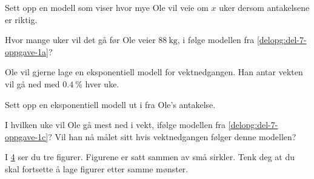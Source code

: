 \begin{oppgaver}
   Sett opp en modell som viser hvor mye Ole vil veie om $x$ uker
  dersom antakelsene er riktig.
  \label{delopg:del-7-oppgave-1a}
\end{oppgaver}

\begin{oppgaver}
   Hvor mange uker vil det gå før Ole veier $\SI{88}{\kg}$, i følge
  modellen fra \cref{delopg:del-7-oppgave-1a}?
\end{oppgaver}

Ole vil gjerne lage en eksponentiell modell for vektnedgangen. Han antar vekten
vil gå ned med $\SI{0.4}{\percent}$ hver uke.

\begin{oppgaver}
   Sett opp en eksponentiell modell ut i fra Ole's antakelse.
  \label{delopg:del-7-oppgave-1c}
\end{oppgaver}

\begin{oppgaver}
   I hvilken uke vil Ole gå mest ned i vekt, ifølge modellen fra
  \cref{delopg:del-7-oppgave-1c}?
  Vil han nå målet sitt hvis vektnedgangen følger denne modellen?
\end{oppgaver}


\Oppgave[4] %

\begin{figure}[H]
  \centering
  \begin{subfigure}[b]{0.32\textwidth}
    \centering
    \caption{}
    \label{fig:del-1-oppgave-8-a}
  \end{subfigure}\hfill%
  \begin{subfigure}[b]{0.32\textwidth}
    \centering
    \caption{}
    \label{fig:del-1-oppgave-8-b}
  \end{subfigure}\hfill%
  \begin{subfigure}[b]{0.32\textwidth}
    \centering
    \vspace{-0.45cm}
    \caption{}
    \label{fig:del-1-oppgave-8-c}
  \end{subfigure}
  \caption{}\label{fig:del-1-oppgave-8}
\end{figure}

I \cref{fig:del-1-oppgave-8} ser du tre figurer. Figurene er satt sammen av små
sirkler. Tenk deg at du skal fortsette å lage figurer etter samme mønster.

